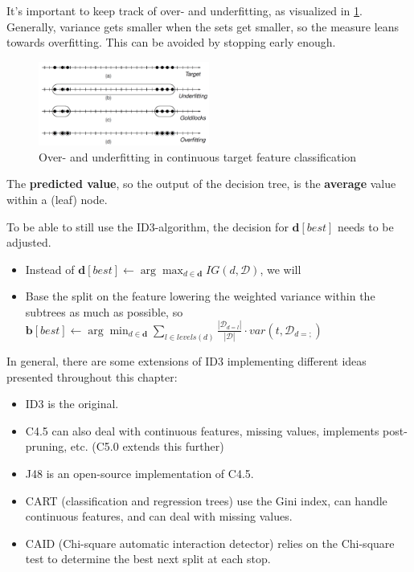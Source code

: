 It's important to keep track of over- and underfitting, as visualized in \ref{fig:3_overunder_target}. Generally, variance gets smaller when the sets get smaller, so the measure leans towards overfitting. This can be avoided by stopping early enough.

\begin{figure}[h]
  \centering
  \includegraphics[width=0.5\textwidth]{assets/trees/cont/target_overunder.png}
  \caption{Over- and underfitting in continuous target feature classification}
  \label{fig:3_overunder_target}
\end{figure}

The \textbf{predicted value}, so the output of the decision tree, is the \textbf{average} value within a (leaf) node.


To be able to still use the ID3-algorithm, the decision for $\mathbf{d}[best]$ needs to be adjusted.
\begin{itemize}
  \item Instead of $\mathbf{d}[best] \leftarrow \arg\max_{d\in\mathbf{d}} IG(d, \mathcal{D})$, we will
  \item Base the split on the feature lowering the weighted variance within the subtrees as much as possible, so $\mathbf{b}[best] \leftarrow \arg\min_{d\in\mathbf{d}}\sum_{l\in levels(d)}\frac{|\mathcal{D}_{d=l}|}{|\mathcal{D}|}\cdot var(t, \mathcal{D}_{d=;})$
\end{itemize}
In general, there are some extensions of ID3 implementing different ideas presented throughout this chapter:
\begin{itemize}
  \item ID3 is the original.
  \item C4.5 can also deal with continuous features, missing values, implements post-pruning, etc. (C5.0 extends this further)
  \item J48 is an open-source implementation of C4.5.
  \item CART (classification and regression trees) use the Gini index, can handle continuous features, and can deal with missing values.
  \item CAID (Chi-square automatic interaction detector) relies on the Chi-square test to determine the best next split at each stop.
\end{itemize}


